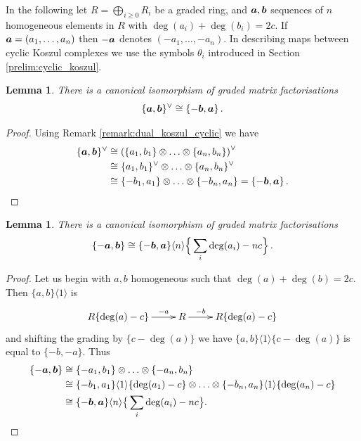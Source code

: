 \documentclass{compositio}
\newtheorem{lemma}[theorem]{Lemma}
\theoremstyle{definition}
\numberwithin{equation}{section}
\begin{document}
In the following let $R = \bigoplus_{i \ge 0} R_i$ be a graded ring, and $\boldsymbol{a}, \boldsymbol{b}$ sequences of $n$ homogeneous elements in $R$ with $\deg(a_i) + \deg(b_i) = 2c$. If $\boldsymbol{a} = (a_1,\ldots,a_n)$ then $- \boldsymbol{a}$ denotes $(-a_1, \ldots, -a_n)$. In describing maps between cyclic Koszul complexes we use the symbols $\theta_i$ introduced in Section \ref{prelim:cyclic_koszul}.

\begin{lemma}\label{lemma:cyclickos1} There is a canonical isomorphism of graded matrix factorisations
\[
\{ \boldsymbol{a}, \boldsymbol{b} \}^{\vee} \cong \{ -\boldsymbol{b}, \boldsymbol{a} \} \, .
\]
\end{lemma}
\begin{proof}
Using Remark \ref{remark:dual_koszul_cyclic} we have
\begin{align*}
\{ \boldsymbol{a}, \boldsymbol{b} \}^{\vee} &\cong \left( \{ a_1, b_1 \} \otimes \ldots \otimes \{ a_n, b_n \} \right)^{\vee}\\
&\cong \{ a_1, b_1 \}^{\vee} \otimes \ldots \otimes \{ a_n, b_n \}^{\vee}\\
&\cong \{ -b_1, a_1 \} \otimes \ldots \otimes \{ -b_n, a_n \} = \{ - \boldsymbol{b}, \boldsymbol{a} \} \, .
\end{align*}
\end{proof}

\begin{lemma}\label{lemma:cyclickos2} There is a canonical isomorphism of graded matrix factorisations
\begin{equation}
\label{abba}
\{ - \boldsymbol{a}, \boldsymbol{b} \} \cong \{ -\boldsymbol{b}, \boldsymbol{a} \}\langle n \rangle \Big\{ \sum_i \deg(a_i) - nc \Big\} \, .
\end{equation}
\end{lemma}
\begin{proof}
Let us begin with $a,b$ homogeneous such that $\deg(a) + \deg(b) = 2c$. Then $\{ a, b \}\langle 1 \rangle$ is
\[
\xymatrix{
R\{ \deg(a) - c \} \ar[r]^-{-a} & R \ar[r]^-{-b} & R\{ \deg(a) - c \}
}
\]
and shifting the grading by $\{ c - \deg(a) \}$ we have $\{ a, b \}\langle 1 \rangle\{ c - \deg(a) \}$ is equal to $\{ -b, -a \}$. Thus
\begin{align*}
\{ - \boldsymbol{a}, \boldsymbol{b} \} &\cong \{ -a_1, b_1 \} \otimes \ldots \otimes \{ -a_n, b_n \}\\
&\cong \{ -b_1, a_1 \}\langle 1 \rangle\{ \deg(a_1) - c \} \otimes \ldots \otimes \{ -b_n, a_n \}\langle 1 \rangle\{ \deg(a_n) - c \}\\
&\cong \{ -\boldsymbol{b}, \boldsymbol{a} \}\langle n \rangle\big\{ \sum_i \deg(a_i) - nc \big\}.
\end{align*}
\end{proof}
\end{document}
